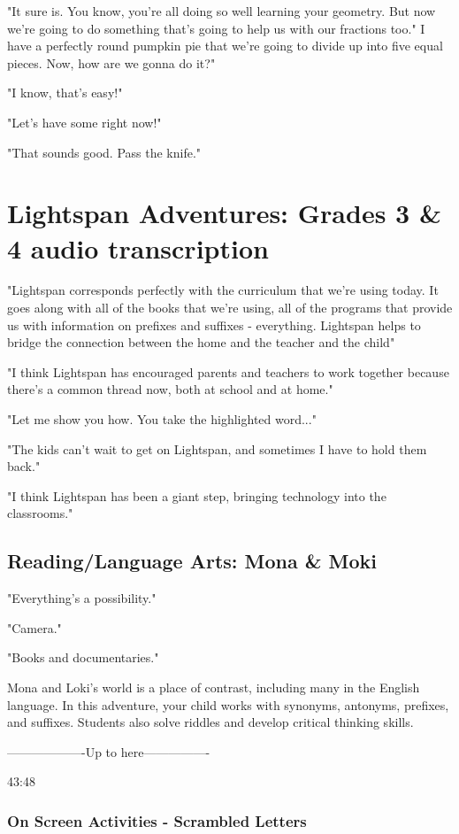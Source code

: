 "It sure is.
You know, you're all doing so well learning your geometry.
But now we're going to do something that's going to help us with our fractions too."
I have a perfectly round pumpkin pie that we're going to divide up into five equal pieces.
Now, how are we gonna do it?"

"I know, that's easy!"

"Let's have some right now!"

"That sounds good. Pass the knife."

\section{Lightspan Adventures: Grades 3 \& 4 audio transcription}

"Lightspan corresponds perfectly with the curriculum that we're using today.
It goes along with all of the books that we're using, all of the programs that provide us with information on prefixes and suffixes - everything.
Lightspan helps to bridge the connection between the home and the teacher and the child"

"I think Lightspan has encouraged parents and teachers to work together because there's a common thread now, both at school and at home."

"Let me show you how. You take the highlighted word..."

"The kids can't wait to get on Lightspan, and sometimes I have to hold them back."

"I think Lightspan has been a giant step, bringing technology into the classrooms."

\subsection{Reading/Language Arts: Mona \& Moki}

"Everything's a possibility."

"Camera."

"Books and documentaries."

Mona and Loki's world is a place of contrast, including many in the English language.
In this adventure, your child works with synonyms, antonyms, prefixes, and suffixes.
Students also solve riddles and develop critical thinking skills.

-------------------Up to here----------------

43:48

\subsubsection{On Screen Activities - Scrambled Letters}

